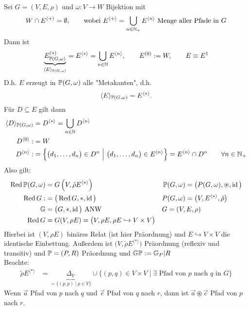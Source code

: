 \begin{lemma}
	Sei $G=(V,E,\rho)$ und $\omega:V\to W$ Bijektion mit 
	\begin{align*}
		W\cap E^{\langle+\rangle}=\emptyset,\qquad\text{wobei }
		E^{\langle +\rangle}=\bigcup_{n\in\N_+}E^{\langle n\rangle}\text{ Menge aller Pfade in }G
	\end{align*}
	Dann ist
	\begin{align*}
		\underbrace{E^{(\ast)}_{\P(G,\omega)}}_{\langle E\rangle_{\P(G,\omega)}}=E^{\langle\ast\rangle}=\bigcup\limits_{n\in\N} E^{\langle n\rangle},\qquad E^{(0)}:=W,\qquad
		E\equiv E^1
	\end{align*}
	D.h. $E$ erzeugt in $\P(G,\omega)$ alle "Metakanten", d.h.
	\begin{align*}
		\langle E\rangle_{\P(G,\omega)}=E^{\langle\ast\rangle}.
	\end{align*}
	Für $D\subseteq E$ gilt dann 
	\begin{align*}
		\langle D\rangle_{\P(G,\omega)}&=D^{\langle\ast\rangle}=\bigcup\limits_{n\in\N} D^{\langle n\rangle}\\
		D^{\langle0\rangle}:&=W\\
		D^{\langle n\rangle}:&=\left\lbrace\big(d_1,\ldots,d_n\big)\in D^n~\Big|~\big(d_1,\ldots,d_n\big)\in E^{\langle n\rangle}\right\rbrace=E^{\langle n\rangle}\cap D^n\qquad\forall n\in\N_+
	\end{align*}
	Also gilt:
	\begin{align*}
		\Red\P(G,\omega)&=G\left(V,\tilde{\rho} E^{\langle\ast\rangle}\right) &\P&(G,\omega)=\big(P(G,\omega),\circledast,\id\big)\\
		\Red G:&=\big(\Red G,\ast,\id\big) &P&(G,\omega)=\big(V,E^{\langle\ast\rangle},\tilde{\rho}\big)\\
		\mathbb{G}&=\big(G,\ast,\id\big)\text{ ANW} &G&=(V,E,\rho)\\
		\Red G&=G(V,\rho E)=\big(V,\rho E,\rho E\hookrightarrow V\times V\big)
	\end{align*}
	Hierbei ist $(V,\rho E)$ binäres Relat (ist hier Präordnung) und $E\hookrightarrow V\times V$ die identische Einbettung. Außerdem ist $\big(V,\tilde{\rho}E^{\langle\ast\rangle}\big)$ Präordnung (reflexiv und transitiv) und $\P=(P,R)$ Präordnung und $\mathbb{G}\P:=\mathbb{G}_P|R$\\
	Beachte:
	\begin{align*}
		\tilde{\rho} E^{\langle\ast\rangle}&=\underbrace{\Delta_V}_{=\lbrace(p,p)\mid p\in V\rbrace}\cup\big\lbrace(p,q)\in V\times V\mid\exists\text{ Pfad von $p$ nach $q$ in }G\big\rbrace
	\end{align*}
	Wenn $\vec{a}$ Pfad von $p$ nach $q$ und $\vec{c}$ Pfad von $q$ nach $r$, dann ist $\vec{a}\circledast\vec{c}$ Pfad von $p$ nach $r$.
\end{lemma}

